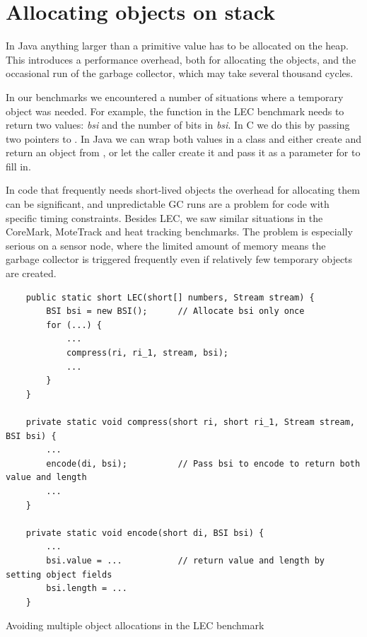 \section{Allocating objects on stack}
\label{sec-no-gc}
In Java anything larger than a primitive value has to be allocated on the heap. This introduces a performance overhead, both for allocating the objects, and the occasional run of the garbage collector, which may take several thousand cycles.

In our benchmarks we encountered a number of situations where a temporary object was needed. For example, the  function in the LEC benchmark needs to return two values: \emph{bsi} and the number of bits in \emph{bsi}. In C we do this by passing two pointers to . In Java we can wrap both values in a class and either create and return an object from , or let the caller create it and pass it as a parameter for  to fill in.

In code that frequently needs short-lived objects the overhead for allocating them can be significant, and unpredictable GC runs are a problem for code with specific timing constraints. Besides LEC, we saw similar situations in the CoreMark, MoteTrack and heat tracking benchmarks. The problem is especially serious on a sensor node, where the limited amount of memory means the garbage collector is triggered frequently even if relatively few temporary objects are created.

\begin{listing}[]
	\centering
	\begin{verbatim}
    public static short LEC(short[] numbers, Stream stream) {
        BSI bsi = new BSI();      // Allocate bsi only once
        for (...) {
            ...
            compress(ri, ri_1, stream, bsi);
            ...
        }
    }

    private static void compress(short ri, short ri_1, Stream stream, BSI bsi) {
        ...
        encode(di, bsi);          // Pass bsi to encode to return both value and length
        ...
    }

    private static void encode(short di, BSI bsi) {
        ...
        bsi.value = ...           // return value and length by setting object fields
        bsi.length = ...
    }
	\end{verbatim}
\caption{Avoiding multiple object allocations in the LEC benchmark}
\label{lst-lec-avoiding-object-allocations}
\end{listing}

